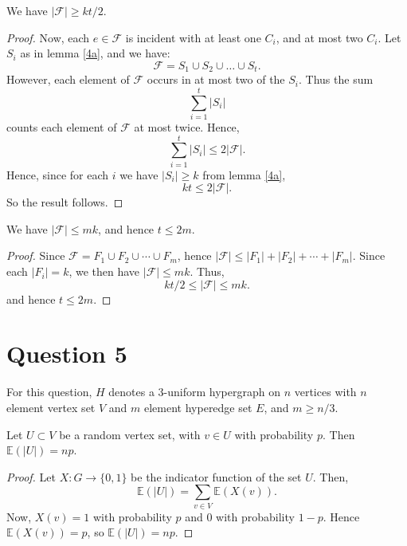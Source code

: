\documentclass{unswmaths}
\begin{document}
\begin{corollary}[Part (b)]
    We have $|\mathcal{F}| \geq kt/2$.
\end{corollary}
\begin{proof}
    Now, each $e \in \mathcal{F}$ is incident with at least one $C_i$, and at
    most two $C_i$. Let $S_i$ as in lemma \ref{4a}, and we have:
    \begin{equation*}
        \mathcal{F} = S_1\cup S_2\cup \ldots \cup S_t. 
    \end{equation*}
    However, each element of $\mathcal{F}$ occurs in at most two of the $S_i$. 
    Thus the sum
    \begin{equation*}
       \sum_{i=1}^t |S_i|
    \end{equation*}
    counts each element of $\mathcal{F}$ at most twice. Hence,
    \begin{equation*}
        \sum_{i=1}^t |S_i| \leq 2|\mathcal{F}|.
    \end{equation*}
    Hence, since for each $i$ we have $|S_i| \geq k$ from lemma \ref{4a}, 
    \begin{equation*}
        kt \leq 2|\mathcal{F}|.
    \end{equation*}
    So the result follows.
\end{proof}

\begin{corollary}[Part (c)]
    We have $|\mathcal{F}| \leq mk$, and hence $t \leq 2m$.
\end{corollary}
\begin{proof}
    Since $\mathcal{F} = F_1\cup F_2\cup\cdots\cup F_m$, hence $|\mathcal{F}| \leq |F_1|+|F_2|+\cdots+|F_m|$. 
    Since each $|F_i| = k$, we then have $|\mathcal{F}| \leq mk$. 
    Thus,
    \begin{equation*}
        kt/2 \leq |\mathcal{F}| \leq mk.
    \end{equation*}
    and hence $t \leq 2m$. 
\end{proof}


\section*{Question 5}

For this question, $H$ denotes a $3$-uniform hypergraph
on $n$ vertices with $n$ element vertex set $V$
and $m$ element hyperedge set $E$, and $m \geq n/3$.

\begin{lemma}[Part (a)]
    \label{5a}
    Let $U \subset V$ be a random vertex set, with $v \in U$
    with probability $p$. Then $\mathbb{E}(|U|) = np$.
\end{lemma}
\begin{proof}
    Let $X:G\to \{0,1\}$ be the indicator function of the set $U$.
    Then,
    \begin{equation*}
        \mathbb{E}(|U|) = \sum_{v \in V} \mathbb{E}(X(v)).
    \end{equation*}
    Now, $X(v) = 1$ with probability $p$ and $0$ with probability $1-p$.
    Hence $\mathbb{E}(X(v)) = p$, so $\mathbb{E}(|U|) = np$.
\end{proof}
\end{document}
